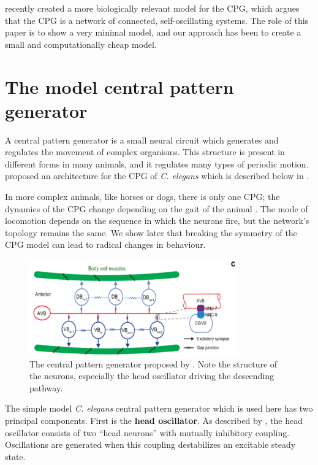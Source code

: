 \documentclass[
    11pt,
]{article}
\begin{document}
\citet{olivares2019} recently created a more biologically relevant model for the CPG, which argues that the CPG is a network of connected, self-oscillating systems.  The role of this paper is to show a very minimal model, and our approach has been to create a small and computationally cheap model.

\section{The model central pattern generator}


A central pattern generator is a small neural circuit which generates and regulates the movement of complex organisms.  This structure is present in different forms in many animals, and it regulates many types of periodic motion.  \citet{xu2018} proposed an architecture for the CPG of \emph{C. elegans} which is described below in .

In more complex animals, like horses or dogs, there is only one CPG; the dynamics of the CPG change depending on the gait of the animal \citep{collins1994}.  The mode of locomotion depends on the sequence in which the neurons fire, but the network's topology remains the same.  We show later that breaking the symmetry of the CPG model can lead to radical changes in behaviour.
\setcounter{figure}{1}
\begin{figure}[h!]
    \ContinuedFloat*
    \centering
    \includegraphics[width=9cm]{figures/xu_cpg/xu_cpg.png}
    \caption{The central pattern generator proposed by \citet{xu2018}.  Note the structure of the neurons, especially the head oscillator driving the descending pathway.}
    \label{fig: xu_cpg}
\end{figure}

The simple model \emph{C. elegans} central pattern generator which is used here has two principal components.  First is the \textbf{head oscillator}. As described by \citet{gjorgjieva2014}, the head oscillator consists of two “head neurons” with mutually inhibitory coupling. Oscillations are generated when this coupling destabilizes an excitable steady state.
\end{document}
